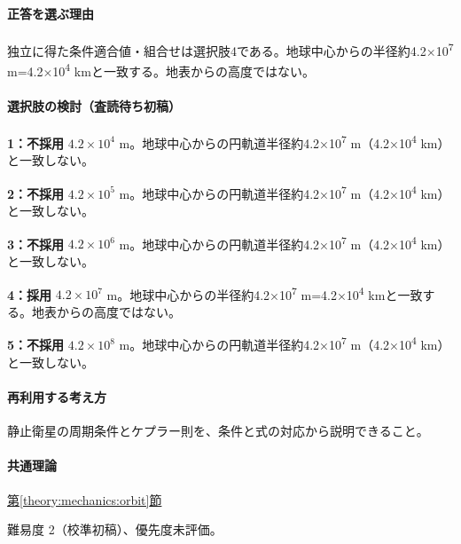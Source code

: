\paragraph{正答を選ぶ理由} 独立に得た条件適合値・組合せは選択肢4である。地球中心からの半径約4.2×10\textsuperscript{7} m=\allowbreak{}4.2×10\textsuperscript{4} kmと一致する。地表からの高度ではない。

\paragraph{選択肢の検討（査読待ち初稿）}\mbox{}\par

\noindent\textbf{1：不採用} \(4.2\times10^4\) m。地球中心からの円軌道半径約4.2×10\textsuperscript{7} m（4.2×10\textsuperscript{4} km）と一致しない。\par

\noindent\textbf{2：不採用} \(4.2\times10^5\) m。地球中心からの円軌道半径約4.2×10\textsuperscript{7} m（4.2×10\textsuperscript{4} km）と一致しない。\par

\noindent\textbf{3：不採用} \(4.2\times10^6\) m。地球中心からの円軌道半径約4.2×10\textsuperscript{7} m（4.2×10\textsuperscript{4} km）と一致しない。\par

\noindent\textbf{4：採用} \(4.2\times10^7\) m。地球中心からの半径約4.2×10\textsuperscript{7} m=\allowbreak{}4.2×10\textsuperscript{4} kmと一致する。地表からの高度ではない。\par

\noindent\textbf{5：不採用} \(4.2\times10^8\) m。地球中心からの円軌道半径約4.2×10\textsuperscript{7} m（4.2×10\textsuperscript{4} km）と一致しない。\par

\paragraph{再利用する考え方} 静止衛星の周期条件とケプラー則を、条件と式の対応から説明できること。

\paragraph{共通理論} \hyperref[theory:mechanics:orbit]{第\ref*{theory:mechanics:orbit}節}

\par 難易度 2（校準初稿）、優先度未評価。

